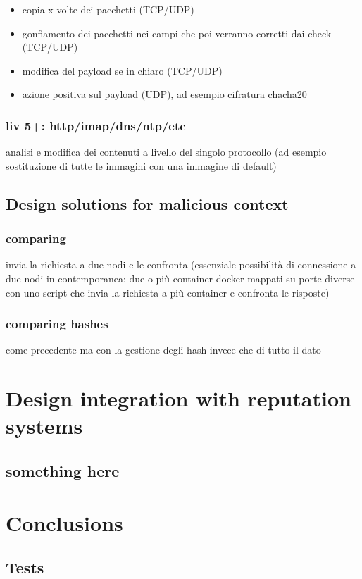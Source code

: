 \documentclass[]{article}
\begin{document}
			\begin{itemize}
				\item copia x volte dei pacchetti (TCP/UDP)
				\item gonfiamento dei pacchetti nei campi che poi verranno corretti dai check (TCP/UDP)
				\item modifica del payload se in chiaro (TCP/UDP)
				\item azione positiva sul payload (UDP), ad esempio cifratura chacha20
			\end{itemize}
		 	\subsubsection{liv 5+: http/imap/dns/ntp/etc}
				analisi e modifica dei contenuti a livello del singolo protocollo (ad esempio sostituzione di tutte le immagini con una immagine di default)
			
	\subsection{Design solutions for malicious context}
		\subsubsection{comparing}
		invia la richiesta a due nodi e le confronta (essenziale possibilità di connessione a due nodi in contemporanea: due o più container docker mappati su porte diverse con uno script che invia la richiesta a più container e confronta le risposte)
		\subsubsection{comparing hashes}
		come precedente ma con la gestione degli hash invece che di tutto il dato
	\section{Design integration with reputation systems}
	
	\subsection{something here}
	
		
\section{Conclusions}
	\subsection{Tests}
\end{document}
